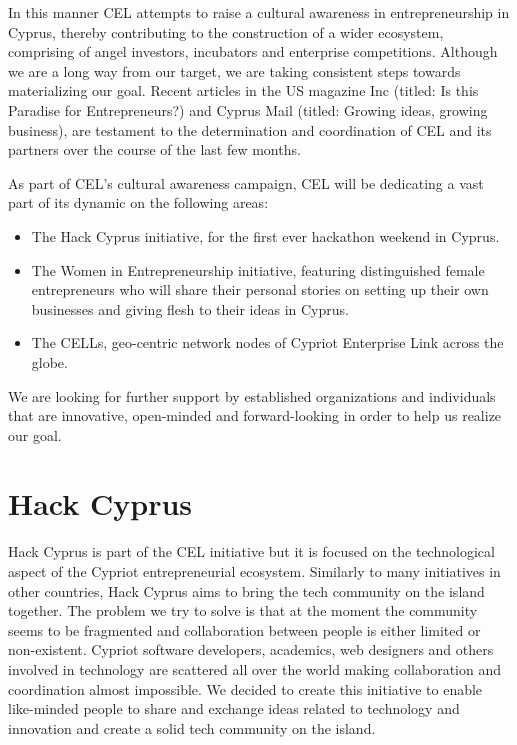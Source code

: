 \documentclass[a4paper,11pt]{report}
\begin{document}
In this manner CEL attempts to raise a cultural awareness in entrepreneurship in Cyprus, thereby contributing to the construction of a wider ecosystem, comprising of angel investors, incubators and enterprise competitions. Although we are a long way from our target, we are taking consistent steps towards materializing our goal. Recent articles in the US magazine Inc (titled: Is this Paradise for Entrepreneurs?) and Cyprus Mail (titled: Growing ideas, growing business), are testament to the determination and coordination of CEL and its partners over the course of the last few months.

As part of CEL’s cultural awareness campaign, CEL will be dedicating a vast part of its dynamic on the following areas:
\begin{itemize}
  \item The Hack Cyprus initiative, for the first ever hackathon weekend in Cyprus.
  \item The Women in Entrepreneurship initiative, featuring distinguished female entrepreneurs who will share their personal stories on setting up their own businesses and giving flesh to their ideas in Cyprus.
  \item The CELLs, geo-centric network nodes of Cypriot Enterprise Link across the globe. 
\end{itemize}

We are looking for further support by established organizations and individuals that are innovative, open-minded and forward-looking in order to help us realize our goal.

\section{Hack Cyprus}
Hack Cyprus is part of the CEL initiative but it is focused on the technological aspect of the Cypriot entrepreneurial ecosystem. Similarly to many initiatives in other countries, Hack Cyprus aims to bring the tech community on the island together. The problem we try to solve is that at the moment the community seems to be fragmented and collaboration between people is either limited or non-existent. Cypriot software developers, academics, web designers and others involved in technology are scattered all over the world making collaboration and coordination almost impossible. We decided to create this initiative to enable like-minded people to share and exchange ideas related to technology and innovation and create a solid tech community on the island. 
\end{document}
